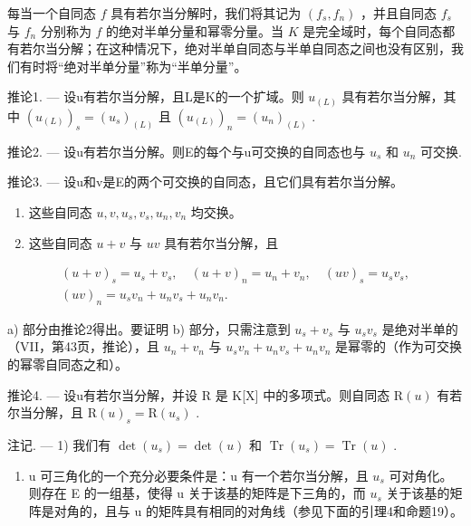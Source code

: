 每当一个自同态 \(f\) 具有若尔当分解时，我们将其记为 \((f_s, f_n)\) ，并且自同态 \(f_s\) 与 \(f_n\) 分别称为 \(f\) 的绝对半单分量和幂零分量。当 \(K\) 是完全域时，每个自同态都有若尔当分解；在这种情况下，绝对半单自同态与半单自同态之间也没有区别，我们有时将“绝对半单分量”称为“半单分量”。

推论1. --- 设u有若尔当分解，且L是K的一个扩域。则 \(u_{(L)}\) 具有若尔当分解，其中 \((u_{(L)})_{s} = (u_{s})_{(L)}\) 且 \((u_{(L)})_{n} = (u_{n})_{(L)}\) .

推论2. --- 设u有若尔当分解。则E的每个与u可交换的自同态也与 \(u_{s}\) 和 \(u_{n}\) 可交换.

推论3. --- 设u和v是E的两个可交换的自同态，且它们具有若尔当分解。

\begin{enumerate}
\def\labelenumi{\alph{enumi})}
\item
  这些自同态 \(u, v, u_s, v_s, u_n, v_n\) 均交换。
\item
  这些自同态 \(u + v\) 与 \(uv\) 具有若尔当分解，且
\end{enumerate}

\[
\begin{array}{c} (u + v) _ {s} = u _ {s} + v _ {s}, \quad (u + v) _ {n} = u _ {n} + v _ {n}, \quad (u v) _ {s} = u _ {s} v _ {s}, \\ (u v) _ {n} = u _ {s} v _ {n} + u _ {n} v _ {s} + u _ {n} v _ {n}. \end{array}
\]

a) 部分由推论2得出。要证明 b) 部分，只需注意到 \(u_{s} + v_{s}\) 与 \(u_{s}v_{s}\) 是绝对半单的（VII，第43页，推论），且 \(u_{n} + v_{n}\) 与 \(u_{s}v_{n} + u_{n}v_{s} + u_{n}v_{n}\) 是幂零的（作为可交换的幂零自同态之和）。

推论4. --- 设u有若尔当分解，并设 R 是 K{[}X{]} 中的多项式。则自同态 \(\mathrm{R}(u)\) 有若尔当分解，且 \(\mathrm{R}(u)_{s} = \mathrm{R}(u_{s})\) .

注记. --- 1) 我们有 \(\det(u_s) = \det(u)\) 和 \(\operatorname{Tr}(u_s) = \operatorname{Tr}(u)\) .

\begin{enumerate}
\def\labelenumi{\arabic{enumi})}
\setcounter{enumi}{1}
\tightlist
\item
  u 可三角化的一个充分必要条件是：u 有一个若尔当分解，且 \(u_{s}\) 可对角化。则存在 E 的一组基，使得 u 关于该基的矩阵是下三角的，而 \(u_{s}\) 关于该基的矩阵是对角的，且与 u 的矩阵具有相同的对角线（参见下面的引理4和命题19）。
\end{enumerate}

